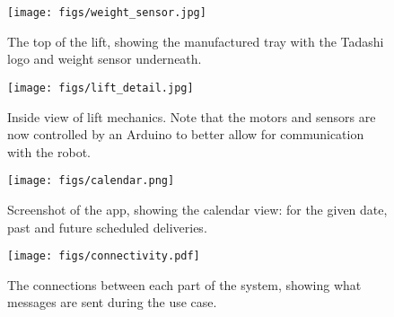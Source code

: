 \documentclass{article}
\begin{document}
\begin{figure}
  \begin{center}
    \texttt{[image: figs/weight\_sensor.jpg]}
    \caption{The top of the lift, showing the manufactured tray with the Tadashi logo and weight sensor underneath.}
  \label{fig:sensor}
  \end{center}
\end{figure}

\begin{figure}
  \begin{center}
    \texttt{[image: figs/lift\_detail.jpg]}
    \caption{Inside view of lift mechanics. Note that the motors and sensors are now controlled by an Arduino to better allow for communication with the robot. }
  \label{fig:arduino}
  \end{center}
\end{figure}
\begin{figure}
  \begin{center}
  \texttt{[image: figs/calendar.png]}
  \caption{Screenshot of the app, showing the calendar view: for the given date, past and future scheduled deliveries.}
  \label{fig:cal}
\end{center}
\end{figure}
\begin{figure*}
  \begin{center}
    \texttt{[image: figs/connectivity.pdf]}
  \end{center}
  \caption{The connections between each part of the system, showing what messages are sent during the use case.}
  \label{fig:connect-larger}
\end{figure*}
\end{document}
